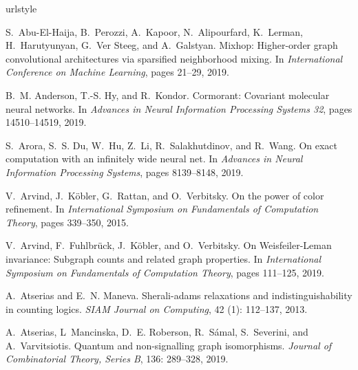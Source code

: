 \documentclass{article}
\theoremstyle{definition}
\begin{document}
 
\begin{thebibliography}{125}
	\providecommand{\natexlab}[1]{#1}
	\providecommand{\url}[1]{\texttt{#1}}
	\expandafter\ifx\csname urlstyle\endcsname\relax
	\providecommand{\doi}[1]{doi: #1}\else
	\providecommand{\doi}{doi: \begingroup \urlstyle{rm}\Url}\fi
	
	S.~Abu{-}El{-}Haija, B.~Perozzi, A.~Kapoor, N.~Alipourfard, K.~Lerman,
	H.~Harutyunyan, G.~Ver Steeg, and A.~Galstyan.
	\newblock Mixhop: Higher-order graph convolutional architectures via sparsified
	neighborhood mixing.
	\newblock In \emph{International Conference on Machine Learning}, pages 21--29,
	2019.
	
	B.~M. Anderson, T.{-}S. Hy, and R.~Kondor.
	\newblock Cormorant: Covariant molecular neural networks.
	\newblock In \emph{Advances in Neural Information Processing Systems 32}, pages
	14510--14519, 2019.
	
	S.~Arora, S.~S. Du, W.~Hu, Z.~Li, R.~Salakhutdinov, and R.~Wang.
	\newblock On exact computation with an infinitely wide neural net.
	\newblock In \emph{Advances in Neural Information Processing Systems}, pages
	8139--8148, 2019.
	
	V.~Arvind, J.~K{\"{o}}bler, G.~Rattan, and O.~Verbitsky.
	\newblock On the power of color refinement.
	\newblock In \emph{International Symposium on Fundamentals of Computation
		Theory}, pages 339--350, 2015.
	
	V.~Arvind, F.~Fuhlbr{\"{u}}ck, J.~K{\"{o}}bler, and O.~Verbitsky.
	\newblock On {Weisfeiler-Leman} invariance: Subgraph counts and related graph
	properties.
	\newblock In \emph{International Symposium on Fundamentals of Computation
		Theory}, pages 111--125, 2019.
	
	A.~Atserias and E.~N. Maneva.
	\newblock Sherali-adams relaxations and indistinguishability in counting
	logics.
	\newblock \emph{{SIAM} Journal on Computing}, 42 (1):
	112--137, 2013.
	
	A.~Atserias, L~Mancinska, D.~E. Roberson, R.~S{\'{a}}mal, S.~Severini, and
	A.~Varvitsiotis.
	\newblock Quantum and non-signalling graph isomorphisms.
	\newblock \emph{Journal of Combinatorial Theory, Series B}, 136:
	289--328, 2019.
	

\end{thebibliography}
\end{document}
